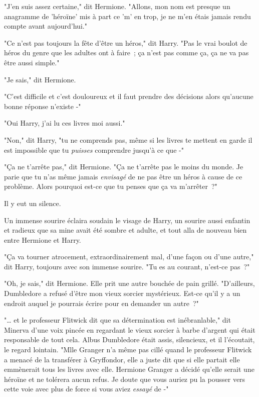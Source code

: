 "J'en suis assez certaine," dit Hermione. "Allons, mon nom est presque un anagramme de 'héroïne' mis à part ce 'm' en trop, je ne m'en étais jamais rendu compte avant aujourd'hui."

"Ce n'est pas toujours la fête d'être un héros," dit Harry. "Pas le vrai boulot de héros du genre que les adultes ont à faire~; ça n'est pas comme ça, ça ne va pas être aussi simple."

"Je sais," dit Hermione.

"C'est difficile et c'est douloureux et il faut prendre des décisions alors qu'aucune bonne réponse n'existe -"

"Oui Harry, j'ai lu ces livres moi aussi."

"Non," dit Harry, "tu ne comprends pas, même si les livres te mettent en garde il est impossible que tu \emph{puisses} comprendre jusqu'à ce que -"

"Ça ne t'arrête pas," dit Hermione. "Ça ne t'arrête pas le moins du monde. Je parie que tu n'as même jamais \emph{envisagé} de ne pas être un héros à cause de ce problème. Alors pourquoi est-ce que tu penses que ça va m'arrêter~?"

Il y eut un silence.

Un immense sourire éclaira soudain le visage de Harry, un sourire aussi enfantin et radieux que sa mine avait été sombre et adulte, et tout alla de nouveau bien entre Hermione et Harry.

"Ça va tourner atrocement, extraordinairement mal, d'une façon ou d'une autre," dit Harry, toujours avec son immense sourire. "Tu es au courant, n'est-ce pas~?"

"Oh, je sais," dit Hermione. Elle prit une autre bouchée de pain grillé. "D'ailleurs, Dumbledore a refusé d'être mon vieux sorcier mystérieux. Est-ce qu'il y a un endroit auquel je pourrais écrire pour en demander un autre~?"


"… et le professeur Flitwick dit que sa détermination est inébranlable," dit Minerva d'une voix pincée en regardant le vieux sorcier à barbe d'argent qui était responsable de tout cela. Albus Dumbledore était assis, silencieux, et il l'écoutait, le regard lointain. "Mlle Granger n'a même pas cillé quand le professeur Flitwick a menacé de la transférer à Gryffondor, elle a juste dit que si elle partait elle emmènerait tous les livres avec elle. Hermione Granger a décidé qu'elle serait une héroïne et ne tolérera aucun refus. Je doute que vous auriez pu la pousser vers cette voie avec plus de force si vous aviez \emph{essayé} de -"

